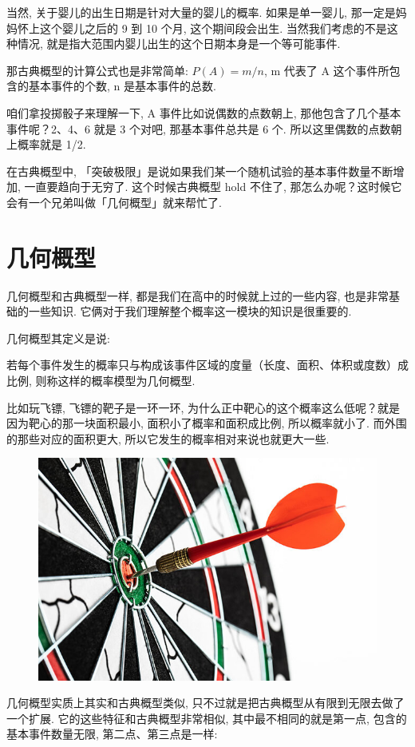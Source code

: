 当然, 关于婴儿的出生日期是针对大量的婴儿的概率. 如果是单一婴儿, 那一定是妈妈怀上这个婴儿之后的 9 到 10 个月, 这个期间段会出生. 当然我们考虑的不是这种情况, 就是指大范围内婴儿出生的这个日期本身是一个等可能事件. 

那古典概型的计算公式也是非常简单: $P(A)  = m/n$, m 代表了 A 这个事件所包含的基本事件的个数, n 是基本事件的总数. 

咱们拿投掷骰子来理解一下, A 事件比如说偶数的点数朝上, 那他包含了几个基本事件呢？2、4、6 就是 3 个对吧, 那基本事件总共是 6 个. 所以这里偶数的点数朝上概率就是 1/2. 

在古典概型中, 「突破极限」是说如果我们某一个随机试验的基本事件数量不断增加, 一直要趋向于无穷了. 这个时候古典概型 hold 不住了, 那怎么办呢？这时候它会有一个兄弟叫做「几何概型」就来帮忙了. 

\section{几何概型}

几何概型和古典概型一样, 都是我们在高中的时候就上过的一些内容, 也是非常基础的一些知识. 它俩对于我们理解整个概率这一模块的知识是很重要的. 

几何概型其定义是说: 

\begin{newquotation}
若每个事件发生的概率只与构成该事件区域的度量（长度、面积、体积或度数）成比例, 则称这样的概率模型为几何概型. 
\end{newquotation}

比如玩飞镖, 飞镖的靶子是一环一环, 为什么正中靶心的这个概率这么低呢？就是因为靶心的那一块面积最小, 面积小了概率和面积成比例, 所以概率就小了. 而外围的那些对应的面积更大, 所以它发生的概率相对来说也就更大一些. 

\begin{figure}[ht]
  \centering
  \includegraphics[width=0.5\linewidth]{asset/15582365192_640x420.jpg}
  \caption{}
  \label{fig:img21_1}
\end{figure}

几何概型实质上其实和古典概型类似, 只不过就是把古典概型从有限到无限去做了一个扩展. 它的这些特征和古典概型非常相似, 其中最不相同的就是第一点, 包含的基本事件数量无限, 第二点、第三点是一样: 

